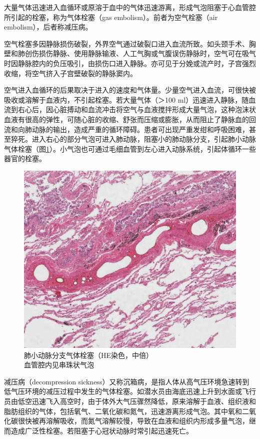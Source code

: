 大量气体迅速进入血循环或原溶于血中的气体迅速游离，形成气泡阻塞于心血管腔所引起的栓塞，称为气体栓塞（gas
embolism）。前者为空气栓塞（air embolism），后者称减压病。

空气栓塞多因静脉损伤破裂，外界空气通过破裂口进入血流所致。如头颈手术、胸壁和肺创伤损伤静脉、使用静脉输液、人工气胸或气腹误伤静脉时，空气可在吸气时因静脉腔内的负压吸引，由损伤口进入静脉。亦可见于分娩或流产时，子宫强烈收缩，将空气挤入子宫壁破裂的静脉窦内。

空气进入血循环的后果取决于进入的速度和气体量。少量空气进入血流，可很快被吸收或溶解于血液内，不引起栓塞。若大量气体（＞100
ml）迅速进入静脉，随血流到右心后，因心脏搏动和血流冲击将空气与血液搅拌形成大量气泡，这种泡沫状血液有很高的弹性，可随心脏的收缩、舒张而压缩或膨胀，从而阻止了静脉血的回流和向肺动脉的输出，造成严重的循环障碍。患者可出现严重发绀和呼吸困难，甚至猝死。进入右心的部分气泡可进入肺动脉，阻塞小的肺动脉分支，引起肺小动脉气体栓塞（图\ref{fig3-11}）。小气泡也可通过毛细血管到左心进入动脉系统，引起体循环一些器官的栓塞。

\begin{figure}[!htbp]
  \centering
  \includegraphics{./images/Image00045.jpg}
  \caption{肺小动脉分支气体栓塞（HE染色，中倍） \\ {\small 血管腔内见串珠状气泡}}
  \label{fig3-11}
\end{figure}


减压病（decompression
sickness）又称沉箱病，是指人体从高气压环境急速转到低气压环境的减压过程中发生的气体栓塞。如潜水员由海底迅速上升到水面或飞行员由低空迅速飞入高空时，由于体外大气压骤然降低，原来溶解于血液、组织液和脂肪组织的气体，包括氧气、二氧化碳和氮气，迅速游离形成气泡。其中氧和二氧化碳很快被再溶解吸收，而氮气溶解较慢，导致在血液和组织内形成多量气泡，继而造成广泛性栓塞。若阻塞于心冠状动脉时常引起迅速死亡。


